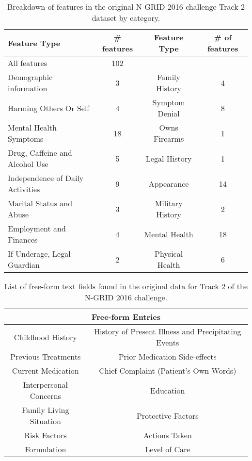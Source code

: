 \begin{table}
{\small
    \centering
    \begin{tabular}{|l|c|c|c|}
    \hline
    \textsf{Feature Type} & \textsf{\# features} & \textsf{Feature Type} & \textsf{\# of features}  \\
    \hline
    \textsf{All features} &       102    & &   \\ 
    \hline
    \textsf{Demographic information} & 3 & \textsf{Family History} & 4 \\
    \textsf{Harming Others Or Self} & 4 & \textsf{Symptom Denial} & 8 \\
    \textsf{Mental Health Symptoms} & 18 & \textsf{Owns Firearms} & 1 \\ 
    \textsf{Drug, Caffeine and Alcohol Use} & 5 & \textsf{Legal History} & 1 \\
    \textsf{Independence of Daily Activities} & 9 & \textsf{Appearance} & 14 \\
    \textsf{Marital Status and Abuse} & 3 & \textsf{Military History} & 2 \\
    \textsf{Employment and Finances} & 4 & \textsf{Mental Health} & 18 \\
    \textsf{If Underage, Legal Guardian} & 2 & \textsf{Physical Health} & 6 \\
    \hline

    \end{tabular}
    \caption{Breakdown of features in the original N-GRID 2016 challenge Track 2 dataset by category.}
    \label{tab:data2}
}
\end{table}
  
\begin{table}
    {\small
    \centering
    \begin{tabular}{|c|c|}  
    \hline
    \multicolumn{2}{|c|}{\textsf{Free-form Entries}} \\
    \hline
    \textsf{Childhood History} & \textsf{History of Present Illness and Precipitating Events}  \\
    \textsf{Previous Treatments} & \textsf{Prior Medication Side-effects} \\
    \textsf{Current Medication} & \textsf{Chief Complaint (Patient's Own Words)}  \\ %
    \textsf{Interpersonal Concerns} & \textsf{Education}  \\
    \textsf{Family Living Situation} & \textsf{Protective Factors}  \\
    \textsf{Risk Factors} & \textsf{Actions Taken}  \\
    \textsf{Formulation} & \textsf{Level of Care} \\
    \hline
    \end{tabular}
    \caption{List of free-form text fields found in the original data for Track 2 of the N-GRID 2016 challenge.}
    \label{tab:textdata}
    }
\end{table}


